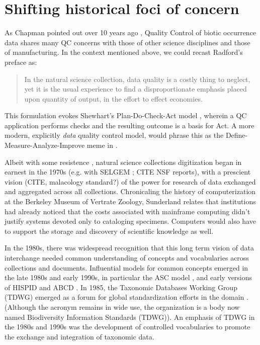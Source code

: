 \documentclass{article}
\begin{document}
  \section{Shifting historical foci of concern}
As Chapman pointed out over 10 years ago \citep{chapman_principles_2005}, Quality Control of biotic occurrence data shares many QC concerns with those of other science disciplines and those of manufacturing. 
In the context mentioned above, we could recast Radford's preface as:
\begin{quotation}
  In the natural science collection, data quality is a costly thing to neglect, yet it is the usual experience to find a disproportionate emphasis placed upon quantity of output, in the effort to effect economies.
\end{quotation}

  This formulation evokes Shewhart's Plan-Do-Check-Act model \citep{shewhart_statistical_1939}, wherein a QC application performs checks and the resulting outcome is a basis for Act. A more modern, explicitly {\em data} quality control model, would phrase this as the Define-Measure-Analyze-Improve meme in \citep{Wang1998}.  

  Albeit with some resistence \citep{ShetlerDemyth1974}, natural science collections digitization began in earnest in the 1970s (e.g. with SELGEM \citep{SELGEM1971}; CITE NSF reports), with a prescient vision (CITE, malacology standard?) of the power for research of data exchanged and aggregated across all collections. Chronicaling the history of computerization at the Berkeley Museum of Vertrate Zoology, Sunderland \citep{Sunderland2013150} relates that institutions had already noticed that the costs associated with mainframe computing didn't justify systems devoted only to cataloging specimens. Computers would also have to support the storage and discovery of scientific knowledge as well.  

In the 1980s, there was widespread recognition that this long term vision of data interchange needed common understanding of concepts and vocabularies across collections and documents.  Influential models for common concepts emerged in the late 1980s and early 1990s, in particular the ASC model \citep{ASC1992}, and early versions of HISPID \citep{HISPID5} and ABCD \citep{ABCD2015}.  In 1985, the Taxonomic Databases Working Group (TDWG) emerged as a forum for global standardization efforts in the domain \citep{tdwg_tdwg_2007}. (Although the acronym remains in wide use, the organization is a body now named Biodiversity Information Standards (TDWG)).  An emphasis of TDWG in the 1980s and 1990s was the development of controlled vocabularies to promote the exchange and integration of taxonomic data.
  
\end{document}
